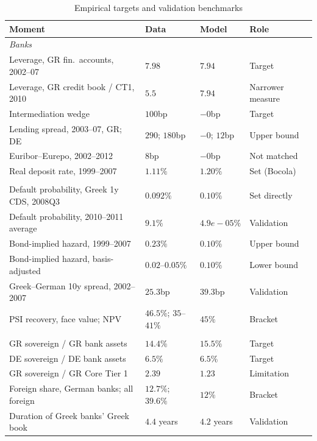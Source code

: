 \begin{table}[H]
  \centering
  \caption{Empirical targets and validation benchmarks}
  \label{tab:targets}
  \footnotesize{}
  \begin{tabular}{llll}
    \toprule
    Moment & Data & Model & Role \\
    \midrule
    \multicolumn{4}{l}{\emph{Banks}} \\
    Leverage, GR fin.\ accounts, 2002--07 & $7.98$ & $7.94$ & Target \\
    Leverage, GR credit book / CT1, 2010 & $5.5$ & $7.94$ & Narrower measure \\
    Intermediation wedge & $100$bp & $-0$bp & Target \\
    Lending spread, 2003--07, GR; DE & $290$; $180$bp & $-0$; $12$bp & Upper bound \\
    Euribor--Eurepo, 2002--2012 & $8$bp & $-0$bp & Not matched \\
    Real deposit rate, 1999--2007 & $1.11\%$ & $1.20\%$ & Set (Bocola) \\
    \addlinespace
    \multicolumn{4}{l}{\emph{Sovereign risk and recovery}} \\
    Default probability, Greek 1y CDS, 2008Q3 & $0.092\%$ & $0.10\%$ & Set directly \\
    Default probability, 2010--2011 average & $9.1\%$ & $4.9e-05\%$ & Validation \\
    Bond-implied hazard, 1999--2007 & $0.23\%$ & $0.10\%$ & Upper bound \\
    Bond-implied hazard, basis-adjusted & $0.02$--$0.05\%$ & $0.10\%$ & Lower bound \\
    Greek--German 10y spread, 2002--2007 & $25.3$bp & $39.3$bp & Validation \\
    PSI recovery, face value; NPV & $46.5\%$; $35$--$41\%$ & $45\%$ & Bracket \\
    \addlinespace
    \multicolumn{4}{l}{\emph{Sovereign exposure}} \\
    GR sovereign / GR bank assets & $14.4\%$ & $15.5\%$ & Target \\
    DE sovereign / DE bank assets & $6.5\%$ & $6.5\%$ & Target \\
    GR sovereign / GR Core Tier 1 & $2.39$ & $1.23$ & Limitation \\
    Foreign share, German banks; all foreign & $12.7\%$; $39.6\%$ & $12\%$ & Bracket \\
    Duration of Greek banks' Greek book & $4.4$ years & $4.2$ years & Validation \\

\end{tabular}
\end{table}
